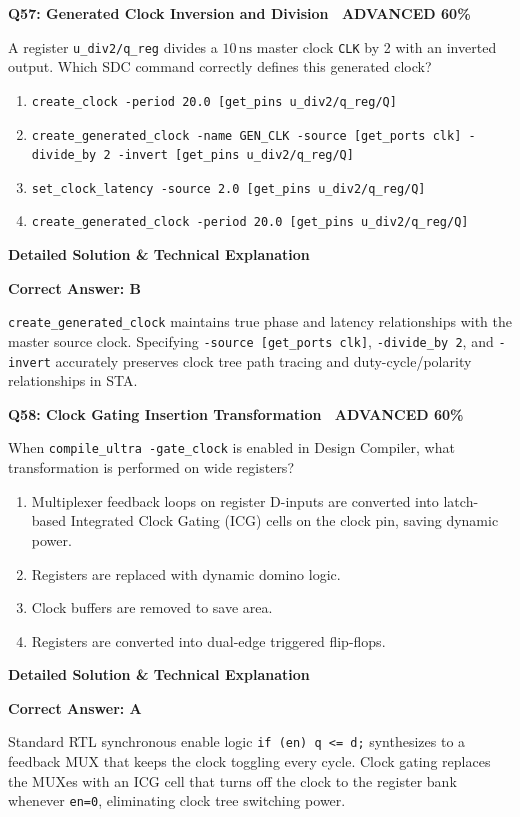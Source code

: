 \documentclass[11pt,a4paper]{article}
\newcommand{\badgeadv}{{\color{white}\colorbox{advred}{\bfseries\sffamily\tiny\ ADVANCED 60\%\ }}}
\newenvironment{qbox}[2]{%
  \begin{mdframed}[style=qstyle]%
  {\bfseries\sffamily\color{primaryblue}#1 \hfill #2}\par\vspace{2pt}%
}{%
  \end{mdframed}%
}
\newenvironment{ansbox}{%
  \begin{mdframed}[style=ansstyle]%
  {\bfseries\sffamily\color{ansgreen}\small Detailed Solution \& Technical Explanation}\par\vspace{2pt}\small%
}{%
  \end{mdframed}%
}
\begin{document}
\begin{qbox}{Q57: Generated Clock Inversion and Division}{\badgeadv}
A register \texttt{u\_div2/q\_reg} divides a $10\,\text{ns}$ master clock \texttt{CLK} by 2 with an inverted output. Which SDC command correctly defines this generated clock?
\begin{enumerate}[label=\textbf{\Alph*.}]
  \item \texttt{create\_clock -period 20.0 [get\_pins u\_div2/q\_reg/Q]}
  \item \texttt{create\_generated\_clock -name GEN\_CLK -source [get\_ports clk] -divide\_by 2 -invert [get\_pins u\_div2/q\_reg/Q]}
  \item \texttt{set\_clock\_latency -source 2.0 [get\_pins u\_div2/q\_reg/Q]}
  \item \texttt{create\_generated\_clock -period 20.0 [get\_pins u\_div2/q\_reg/Q]}
\end{enumerate}
\end{qbox}
\begin{ansbox}
\textbf{Correct Answer: B}

\texttt{create\_generated\_clock} maintains true phase and latency relationships with the master source clock. Specifying \texttt{-source [get\_ports clk]}, \texttt{-divide\_by 2}, and \texttt{-invert} accurately preserves clock tree path tracing and duty-cycle/polarity relationships in STA.
\end{ansbox}

\begin{qbox}{Q58: Clock Gating Insertion Transformation}{\badgeadv}
When \texttt{compile\_ultra -gate\_clock} is enabled in Design Compiler, what transformation is performed on wide registers?
\begin{enumerate}[label=\textbf{\Alph*.}]
  \item Multiplexer feedback loops on register D-inputs are converted into latch-based Integrated Clock Gating (ICG) cells on the clock pin, saving dynamic power.
  \item Registers are replaced with dynamic domino logic.
  \item Clock buffers are removed to save area.
  \item Registers are converted into dual-edge triggered flip-flops.
\end{enumerate}
\end{qbox}
\begin{ansbox}
\textbf{Correct Answer: A}

Standard RTL synchronous enable logic \texttt{if (en) q <= d;} synthesizes to a feedback MUX that keeps the clock toggling every cycle. Clock gating replaces the MUXes with an ICG cell that turns off the clock to the register bank whenever \texttt{en=0}, eliminating clock tree switching power.
\end{ansbox}
\end{document}
